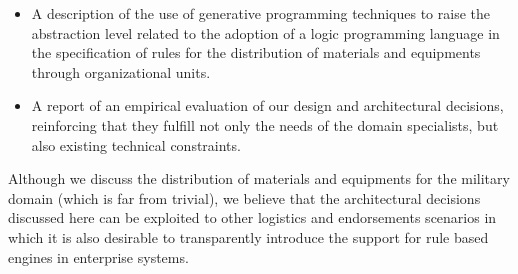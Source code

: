 \begin{itemize}
\item A description of the use of generative programming techniques to raise the abstraction level 
 related to the adoption of a logic programming language in the specification of rules for the 
 distribution of materials and equipments through organizational units.

\item A report of an empirical evaluation of our design and architectural decisions, reinforcing that they fulfill 
 not only the needs of the domain specialists, but also existing technical constraints. 

\end{itemize} 


Although we discuss the distribution of materials and equipments for the military domain (which is far from trivial), we believe that the architectural decisions discussed here can be exploited to other logistics and endorsements scenarios in which it is also desirable to transparently introduce the support for rule based engines in enterprise systems.


